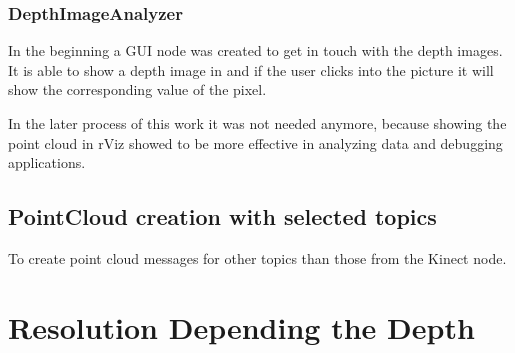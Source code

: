\subsubsection{DepthImageAnalyzer}
In the beginning a GUI node was created to get in touch with the depth images.
It is able to show a depth image in and if the user clicks into the picture it
will show the corresponding value of the pixel.


In the later process of this work it was not needed anymore, because showing the point cloud
in rViz showed to be more effective in analyzing data and debugging applications.

\subsection{PointCloud creation with selected topics}
To create point cloud messages for other topics than those from the Kinect node.





\section{Resolution Depending the Depth}


\subsection{}
 

